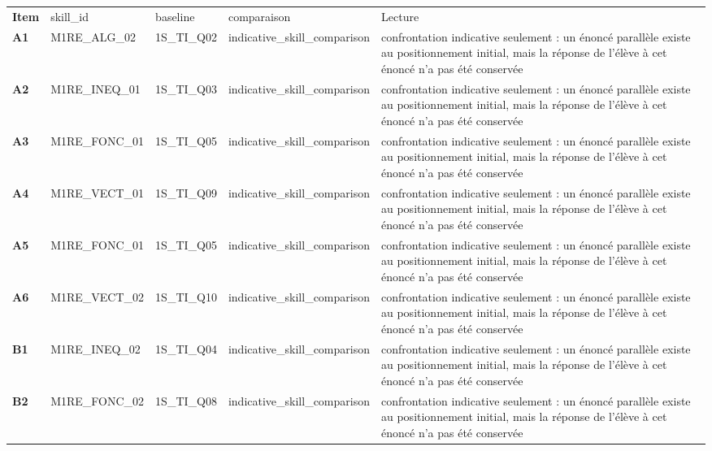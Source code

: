 \documentclass[10pt,a4paper]{article}
\begin{document}
\par\vspace{2mm}
\newpage{}
\par\noindent\begin{tabularx}{\linewidth}{>{\bfseries}p{9mm} >{\ttfamily\scriptsize}p{25mm} >{\ttfamily\scriptsize}p{22mm} >{\ttfamily\scriptsize}p{16mm} X}
\rowcolor{Navy}\color{white}Item & \color{white}\scriptsize skill\_id & \color{white}\scriptsize baseline & \color{white}\scriptsize comparaison & \color{white}Lecture \\
A1 & M1RE\_ALG\_02 & 1S\_TI\_Q02 & indicative\_skill\_comparison & confrontation indicative seulement : un énoncé parallèle existe au positionnement initial, mais la réponse de l'élève à cet énoncé n'a pas été conservée \\
A2 & M1RE\_INEQ\_01 & 1S\_TI\_Q03 & indicative\_skill\_comparison & confrontation indicative seulement : un énoncé parallèle existe au positionnement initial, mais la réponse de l'élève à cet énoncé n'a pas été conservée \\
A3 & M1RE\_FONC\_01 & 1S\_TI\_Q05 & indicative\_skill\_comparison & confrontation indicative seulement : un énoncé parallèle existe au positionnement initial, mais la réponse de l'élève à cet énoncé n'a pas été conservée \\
A4 & M1RE\_VECT\_01 & 1S\_TI\_Q09 & indicative\_skill\_comparison & confrontation indicative seulement : un énoncé parallèle existe au positionnement initial, mais la réponse de l'élève à cet énoncé n'a pas été conservée \\
A5 & M1RE\_FONC\_01 & 1S\_TI\_Q05 & indicative\_skill\_comparison & confrontation indicative seulement : un énoncé parallèle existe au positionnement initial, mais la réponse de l'élève à cet énoncé n'a pas été conservée \\
A6 & M1RE\_VECT\_02 & 1S\_TI\_Q10 & indicative\_skill\_comparison & confrontation indicative seulement : un énoncé parallèle existe au positionnement initial, mais la réponse de l'élève à cet énoncé n'a pas été conservée \\
B1 & M1RE\_INEQ\_02 & 1S\_TI\_Q04 & indicative\_skill\_comparison & confrontation indicative seulement : un énoncé parallèle existe au positionnement initial, mais la réponse de l'élève à cet énoncé n'a pas été conservée \\
B2 & M1RE\_FONC\_02 & 1S\_TI\_Q08 & indicative\_skill\_comparison & confrontation indicative seulement : un énoncé parallèle existe au positionnement initial, mais la réponse de l'élève à cet énoncé n'a pas été conservée \\

\end{tabularx}
\end{document}
